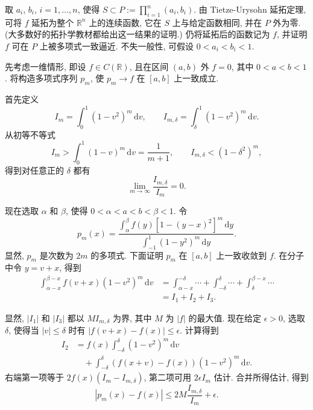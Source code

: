 \begin{Proof}取 $a_i$, $b_i$, $i=1,\ldots,n$, 使得 $S\subset P:=\prod_{i=1}^n(a_i,b_i)$. 由 Tietze-Urysohn 延拓定理, 可将 $f$ 延拓为整个 $\mathbb{R}^n$ 上的连续函数, 它在 $S$ 上与给定函数相同, 并在 $P$ 外为零. (大多数好的拓扑学教材都给出这一结果的证明.) 仍将延拓后的函数记为 $f$, 并证明 $f$ 可在 $P$ 上被多项式一致逼近. 不失一般性, 可假设 $0<a_i<b_i<1$.

先考虑一维情形, 即设 $f\in C(\mathbb{R})$, 且在区间 $(a,b)$ 外 $f=0$, 其中 $0<a<b<1$. 将构造多项式序列 $p_m$, 使 $p_m\to f$ 在 $[a,b]$ 上一致成立.

首先定义
\begin{equation}\label{eq:weierstrass-kernel-integrals}
I_m=\int_0^1(1-v^2)^m\,\mathrm{d}v,\qquad I_{m,\delta}=\int_\delta^1(1-v^2)^m\,\mathrm{d}v.
\end{equation}
从初等不等式
\begin{equation}\label{eq:weierstrass-kernel-integral-bounds}
I_m>\int_0^1(1-v)^m\,\mathrm{d}v=\dfrac1{m+1},\qquad I_{m,\delta}<(1-\delta^2)^m,
\end{equation}
得到对任意正的 $\delta$ 都有
\begin{equation}\label{eq:weierstrass-kernel-tail-limit}
\lim_{m\to\infty}\dfrac{I_{m,\delta}}{I_m}=0.
\end{equation}


现在选取 $\alpha$ 和 $\beta$, 使得 $0<\alpha<a<b<\beta<1$. 令
\begin{equation}\label{eq:weierstrass-one-dimensional-polynomial}
p_m(x)=\dfrac{\int_\alpha^\beta f(y)[1-(y-x)^2]^m\,\mathrm{d}y}{\int_{-1}^1(1-y^2)^m\,\mathrm{d}y}.
\end{equation}
显然, $p_m$ 是次数为 $2m$ 的多项式. 下面证明 $p_m$ 在 $[a,b]$ 上一致收敛到 $f$. 在分子中令 $y=v+x$, 得到
\begin{equation}\label{eq:weierstrass-three-integral-split}
\begin{aligned}
\int_{\alpha-x}^{\beta-x}f(v+x)(1-v^2)^m\,\mathrm{d}v
&=\int_{\alpha-x}^{-\delta}\cdots+\int_{-\delta}^{\delta}\cdots+\int_\delta^{\beta-x}\cdots\\
&=I_1+I_2+I_3.
\end{aligned}
\end{equation}


显然, $|I_1|$ 和 $|I_3|$ 都以 $MI_{m,\delta}$ 为界, 其中 $M$ 为 $|f|$ 的最大值. 现在给定 $\epsilon>0$, 选取 $\delta$, 使得当 $|v|\leq\delta$ 时有 $|f(v+x)-f(x)|\leq\epsilon$. 计算得到
\begin{equation}\label{eq:weierstrass-central-integral}
\begin{aligned}
I_2&=f(x)\int_{-\delta}^{\delta}(1-v^2)^m\,\mathrm{d}v\\
&\quad+\int_{-\delta}^{\delta}(f(x+v)-f(x))(1-v^2)^m\,\mathrm{d}v.
\end{aligned}
\end{equation}
右端第一项等于 $2f(x)(I_m-I_{m,\delta})$, 第二项可用 $2\epsilon I_m$ 估计. 合并所得估计, 得到
\begin{equation}\label{eq:weierstrass-uniform-error-estimate}
|p_m(x)-f(x)|\leq2M\dfrac{I_{m,\delta}}{I_m}+\epsilon.
\end{equation}



\end{Proof}
